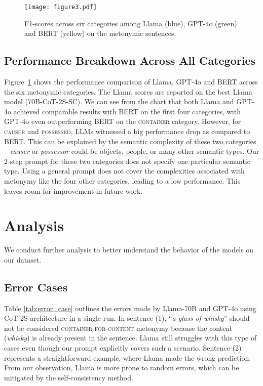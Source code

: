 \documentclass[11pt]{article}
\begin{document}
\begin{figure}[t]
    \centering
    \texttt{[image: figure3.pdf]}
    \caption{F1-scores across six categories among Llama (blue), GPT-4o (green) and BERT (yellow) on the metonymic sentences.}
    \label{fig:llama_bert_gpt_met}
\end{figure}

\subsection{Performance Breakdown Across All Categories}

Figure~\ref{fig:llama_bert_gpt_met} shows the performance comparison of Llama, GPT-4o and BERT across the six metonymic categories. The Llama scores are reported on the best Llama model (70B-CoT-2S-SC). We can see from the chart that both Llama and GPT-4o achieved comparable results with BERT on the first four categories, with GPT-4o even outperforming BERT on the \textsc{container} category. However, for \textsc{causer} and \textsc{possessed}, LLMs witnessed a big performance drop as compared to BERT. This can be explained by the semantic complexity of these two categories -- \textit{causer} or \textit{possessor} could be objects, people, or many other semantic types. Our 2-step prompt for these two categories does not specify one particular semantic type. Using a general prompt does not cover the complexities associated with metonymy like the four other categories, leading to a low performance. This leaves room for improvement in future work.

\section{Analysis}

We conduct further analysis to better understand the behavior of the models on our dataset. 

\subsection{Error Cases}

Table \ref{tab:error_case} outlines the errors made by Llama-70B and GPT-4o using CoT-2S architecture in a single run. In sentence (1), ``\textit{a glass of whisky}'' should not be considered \textsc{container-for-content} metonymy because the content (\textit{whisky}) is already present in the sentence. Llama still struggles with this type of cases even though our prompt explicitly covers such a scenario. Sentence (2) represents a straightforward example, where Llama made the wrong prediction. From our observation, Llama is more prone to random errors, which can be mitigated by the self-consistency method.
\end{document}
